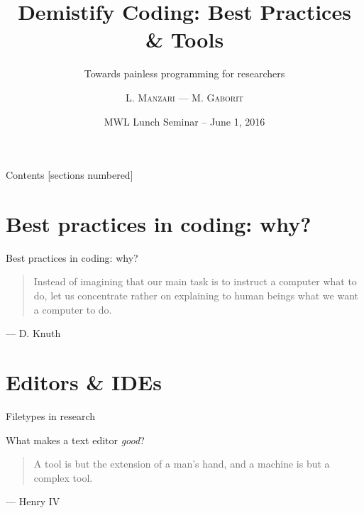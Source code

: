 \documentclass[10pt]{beamer}
\title{Demistify Coding: Best Practices \& Tools}
\subtitle{Towards painless programming for researchers}
\author{L. \textsc{Manzari} --- M. \textsc{Gaborit}}
\date{MWL Lunch Seminar -- June 1, 2016}
\institute{}
\newcommand\fileimage[1]{%
  \draw[fill=black!2] (#1) -- ++(2,0) -- ++(0,2.5) -- ++(-1.5,0) -- ++(-.5,-.5) -- cycle;
}
\begin{document}
\maketitle

\begin{frame}{Contents}
  [sections numbered]
  \tableofcontents[hideallsubsections]
\end{frame}

\section{Best practices in coding: why?}

\begin{frame}{Best practices in coding: why?}

  \begin{quotation}
    Instead of imagining that our main task is to instruct a computer what
    to do, let us concentrate rather on explaining to human beings what we
    want a computer to do.
  \end{quotation}
  \begin{flushright}
    --- D. Knuth
  \end{flushright}

\end{frame}

\section{Editors \& IDEs}

\begin{frame}{Filetypes in research}

  \begin{center}
    \pause{}


  \end{center}
\end{frame}

\begin{frame}{What makes a text editor \emph{good}?}
  \begin{quotation}
    A tool is but the extension of a man's hand, and a machine is but a complex tool.
  \end{quotation}
  \begin{flushright}
    --- Henry IV
  \end{flushright}
\end{frame}
\end{document}

